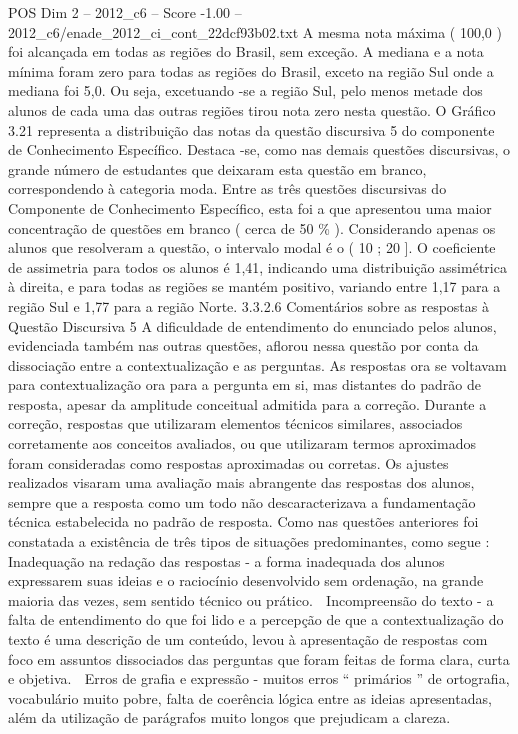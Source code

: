 \begin{textsample}{POS Dim 2 – 2012\_c6 – Score -1.00 – 2012\_c6/enade\_2012\_ci\_cont\_22dcf93b02.txt}
A mesma nota máxima ( 100,0 ) foi alcançada em todas as regiões do Brasil, sem exceção.
A mediana e a nota mínima foram zero para todas as regiões do Brasil, exceto na região Sul onde a mediana foi 5,0.
Ou seja, excetuando -se a região Sul, pelo menos metade dos alunos de cada uma das outras regiões tirou nota zero nesta questão.
O Gráfico 3.21 representa a distribuição das notas da questão discursiva 5 do componente de Conhecimento Específico.
Destaca -se, como nas demais questões discursivas, o grande número de estudantes que deixaram esta questão em branco, correspondendo à categoria moda.
Entre as três questões discursivas do Componente de Conhecimento Específico, esta foi a que apresentou uma maior concentração de questões em branco ( cerca de 50 \% ).
Considerando apenas os alunos que resolveram a questão, o intervalo modal é o ( 10 ; 20 ].
O coeficiente de assimetria para todos os alunos é 1,41, indicando uma distribuição assimétrica à direita, e para todas as regiões se mantém positivo, variando entre 1,17 para a região Sul e 1,77 para a região Norte. 3.3.2.6 Comentários sobre as respostas à Questão Discursiva 5 A dificuldade de entendimento do enunciado pelos alunos, evidenciada também nas outras questões, aflorou nessa questão por conta da dissociação entre a contextualização e as perguntas.
As respostas ora se voltavam para contextualização ora para a pergunta em si, mas distantes do padrão de resposta, apesar da amplitude conceitual admitida para a correção.
Durante a correção, respostas que utilizaram elementos técnicos similares, associados corretamente aos conceitos avaliados, ou que utilizaram termos aproximados foram consideradas como respostas aproximadas ou corretas.
Os ajustes realizados visaram uma avaliação mais abrangente das respostas dos alunos, sempre que a resposta como um todo não descaracterizava a fundamentação técnica estabelecida no padrão de resposta.
Como nas questões anteriores foi constatada a existência de três tipos de situações predominantes, como segue :  Inadequação na redação das respostas - a forma inadequada dos alunos expressarem suas ideias e o raciocínio desenvolvido sem ordenação, na grande maioria das vezes, sem sentido técnico ou prático.  Incompreensão do texto - a falta de entendimento do que foi lido e a percepção de que a contextualização do texto é uma descrição de um conteúdo, levou à apresentação de respostas com foco em assuntos dissociados das perguntas que foram feitas de forma clara, curta e objetiva.  Erros de grafia e expressão - muitos erros “ primários ” de ortografia, vocabulário muito pobre, falta de coerência lógica entre as ideias apresentadas, além da utilização de parágrafos muito longos que prejudicam a clareza.

\end{textsample}
